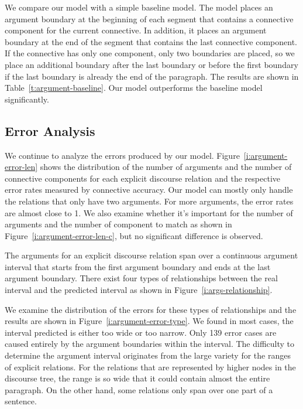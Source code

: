 

We compare our model with a simple baseline model. The model places an argument
boundary at the beginning of each segment that contains a connective component for
the current connective. In addition, it places an argument boundary at the
end of the segment that contains the last connective component. If the connective
has only one component, only two boundaries are placed, so we place an additional
boundary after the last boundary or before the first boundary if
the last boundary is already the end of the paragraph. The results are shown
in Table~\ref{t:argument-baseline}. Our model outperforms the baseline model
significantly.



\subsection{Error Analysis}

We continue to analyze the errors produced by our model.
Figure~\ref{i:argument-error-len} shows the distribution of the number
of arguments and the number of connective components for each explicit discourse
relation and the respective error rates measured by connective accuracy.
Our model can mostly only handle the relations
that only have two arguments. For more arguments, the error rates are almost
close to 1. We also examine whether it's important for
the number of arguments and the number of component to match as shown in
Figure~\ref{i:argument-error-len-c}, but no significant difference is observed.



The arguments for an explicit discourse relation span over a continuous argument interval
that starts from the first argument boundary and ends at the last argument boundary.
There exist four types of relationships between the real interval and the predicted
interval as shown in Figure~\ref{i:args-relationship}.



We examine the distribution of the errors for these types of relationships and the
results are shown in Figure~\ref{i:argument-error-type}. We found in most cases,
the interval predicted is either too wide or too narrow.
Only 139 error cases are caused entirely by the argument boundaries within the
interval. The difficulty to determine the argument interval originates from
the large variety for the ranges of explicit relations. For the relations that
are represented by higher nodes in the discourse tree,
the range is so wide that it could contain almost the entire paragraph.
On the other hand, some relations only span over one part of a sentence.

